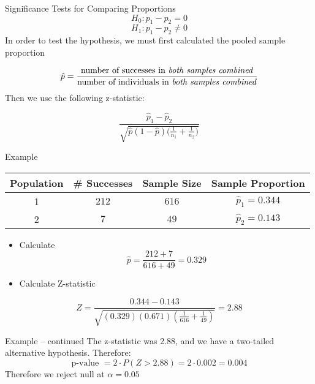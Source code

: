 \documentclass{beamer}
\begin{document}
\begin{frame}{Significance Tests for Comparing Proportions}
	\[ 
		H_0: p_1 - p_2 = 0 
	\]
	\[ 
		H_1: p_1 - p_2 \neq 0 
	\]
	In order to test the hypothesis, we must first calculated the \alert{pooled sample proportion}
	
	\[ \hat{p}=\frac{\text{number of successes in \textit{both samples combined}}}{\text{number of individuals in \textit{both samples combined}}} 
	\]
	Then we use the following z-statistic:
	
	\[ \frac{\hat{p}_1-\hat{p}_2}{\sqrt{\hat{p}(1-\hat{p})\big(\frac{1}{n_1}+\frac{1}{n_2}\big)}} 
	\]
\end{frame}

\begin{frame}{Example}
	\begin{center}
		\begin{tabular}{|c|c|c|c|}
			\hline
			\textbf{Population} & \textbf{\# Successes} & \textbf{Sample Size} & \textbf{Sample Proportion} \\ [0.5ex]
			\hline
			1 & $212$ & $616$ & $\hat{p}_1 = 0.344$ \\
			\hline
			2 & $7$ & $49$ & $\hat{p}_2 = 0.143$ \\
			\hline
		\end{tabular}
	\end{center}

	\pause \begin{itemize}
		\item Calculate \[ 
			\hat{p} = \frac{212+7}{616+49} = 0.329 
		\]
		\item Calculate Z-statistic
	\end{itemize}
	
	\[ 
		Z= \frac{0.344-0.143}{\sqrt{(0.329)(0.671) \left(\frac{1}{616}+\frac{1}{49}\right)} } =2.88
	\]
\end{frame}

\begin{frame}{Example -- continued}
	The z-statistic was 2.88, and we have a two-tailed alternative hypothesis. Therefore:
	\[ 
		\text{p-value }= 2\cdot P(Z>2.88) = 2\cdot 0.002 = 0.004 
	\]
	Therefore we reject null at $\alpha = 0.05$
\end{frame}
\end{document}

